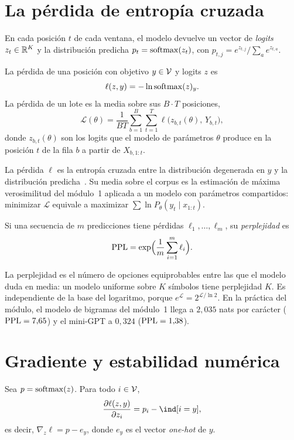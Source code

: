 \section{La pérdida de entropía cruzada}

En cada posición $t$ de cada ventana, el modelo devuelve un vector de \emph{logits} $z_t\in\mathbb{R}^{K}$ y la distribución predicha $p_t=\operatorname{softmax}(z_t)$, con $p_{t,j}=e^{z_{t,j}}/\sum_{a}e^{z_{t,a}}$.

\begin{definicion}\label{def:perdida}
La pérdida de una posición con objetivo $y\in\mathcal{V}$ y logits $z$ es
\[
\ell(z,y)=-\ln\operatorname{softmax}(z)_y.
\]
La pérdida de un lote es la media sobre sus $B\cdot T$ posiciones,
\[
\mathcal{L}(\theta)=\frac{1}{BT}\sum_{b=1}^{B}\sum_{t=1}^{T}\ell\bigl(z_{b,t}(\theta),\,Y_{b,t}\bigr),
\]
donde $z_{b,t}(\theta)$ son los logits que el modelo de parámetros $\theta$ produce en la posición $t$ de la fila $b$ a partir de $X_{b,1:t}$.
\end{definicion}

La pérdida $\ell$ es la entropía cruzada entre la distribución degenerada en $y$ y la distribución predicha~\cite[§4.1]{cs336}. Su media sobre el corpus es la estimación de máxima verosimilitud del módulo~1 aplicada a un modelo con parámetros compartidos: minimizar $\mathcal{L}$ equivale a maximizar $\sum\ln P_\theta(y_t\mid x_{1:t})$.

\begin{definicion}[Perplejidad]\label{def:ppl}
Si una secuencia de $m$ predicciones tiene pérdidas $\ell_1,\dots,\ell_m$, su \emph{perplejidad} es
\[
\operatorname{PPL}=\exp\Bigl(\frac1m\sum_{i=1}^{m}\ell_i\Bigr).
\]
\end{definicion}

La perplejidad es el número de opciones equiprobables entre las que el modelo duda en media: un modelo uniforme sobre $K$ símbolos tiene perplejidad $K$. Es independiente de la base del logaritmo, porque $e^{\mathcal{L}}=2^{\mathcal{L}/\ln 2}$. En la práctica del módulo, el modelo de bigramas del módulo~1 llega a $2{,}035$ nats por carácter ($\operatorname{PPL}=7{,}65$) y el mini-GPT a $0{,}324$ ($\operatorname{PPL}=1{,}38$).

\section{Gradiente y estabilidad numérica}

\begin{proposicion}\label{prop:gradiente}
Sea $p=\operatorname{softmax}(z)$. Para todo $i\in\mathcal{V}$,
\[
\frac{\partial\ell(z,y)}{\partial z_i}=p_i-\ind[i=y],
\]
es decir, $\nabla_z\ell=p-e_y$, donde $e_y$ es el vector \emph{one-hot} de $y$.
\end{proposicion}

